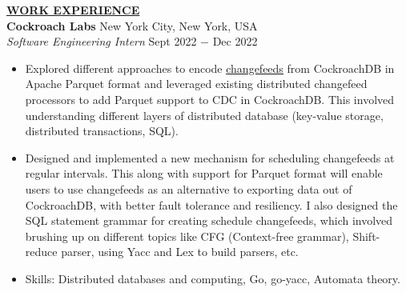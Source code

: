 \documentclass{article}
\begin{document}
% 
%
\noindent \textbf{\underline{WORK EXPERIENCE}} \\
\noindent \textbf{Cockroach Labs} \hfill New York City, New York, USA\\
\textit{Software Engineering Intern} \hfill Sept 2022 $-$ Dec 2022
\begin{itemize}[noitemsep,nolistsep,leftmargin=*]
	\item Explored different approaches to encode \href{https://www.cockroachlabs.com/docs/stable/change-data-capture-overview.html}{\underline{changefeeds}} from CockroachDB in Apache Parquet format and leveraged existing distributed changefeed processors to add Parquet support to CDC in CockroachDB. This involved understanding different layers of distributed database (key-value storage, distributed transactions, SQL).
	\item Designed and implemented a new mechanism for scheduling changefeeds at regular intervals. This along with support for Parquet format will enable users to use changefeeds as an alternative to exporting data out of CockroachDB, with better fault tolerance and resiliency. I also designed the SQL statement grammar for creating schedule changefeeds, which involved brushing up on different topics like CFG (Context-free grammar), Shift-reduce parser, using Yacc and Lex to build parsers, etc.
	\item Skills: Distributed databases and computing, Go, go-yacc, Automata theory. \\
\end{itemize}
\end{document}
